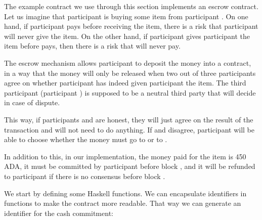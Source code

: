 \documentclass[runningheads]{llncs}
\begin{document}
The example contract we use through this section implements an escrow contract. Let us imagine that participant 
 is buying some item from participant . On one hand, if participant  
pays before receiving the item, there is a risk that participant  will never give  the 
item. On the other hand, if participant  gives participant  the item before 
 pays, then there is a risk that  will never pay.

The escrow mechanism allows participant  to deposit the money into a contract, in a way that the money 
will only be released when two out of three participants agree on whether participant  has indeed given 
participant  the item. The third participant (participant ) is supposed to be a 
neutral third party that will decide in case of dispute.

This way, if participants  and  are honest, they will just agree on the result of the 
transaction and  will not need to do anything. If  and  disagree, 
participant  will be able to choose whether the money must go to  or to 
.

In addition to this, in our implementation, the money paid for the item is 450 ADA, it must be committed by participant 
 before block , and it will be refunded to participant  if there is 
no consensus before block .

We start by defining some Haskell functions. We can encapsulate identifiers in functions to make the contract more 
readable. That way we can generate an identifier for the cash commitment:
\end{document}
